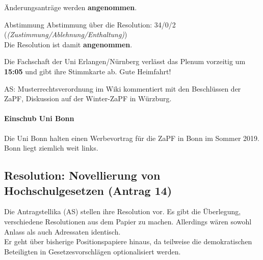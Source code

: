     Änderungsanträge werden \textbf{angenommen}.

    \begin{success}{Abstimmung}
      Abstimmung über die Resolution: 34/0/2 (\textit{(Zustimmung/Ablehnung/Enthaltung)}) \\
      Die Resolution ist damit \textbf{angenommen}.
    \end{success}

    \begin{info}{}
      Die Fachschaft der Uni Erlangen/Nürnberg verlässt das Plenum vorzeitig um \textbf{15:05} und gibt ihre Stimmkarte ab. Gute Heimfahrt!
    \end{info}

    AS: Musterrechtsverordnung im Wiki kommentiert mit den Beschlüssen der ZaPF, Diskussion auf der Winter-ZaPF in Würzburg.

    \paragraph{Einschub Uni Bonn}
      Die Uni Bonn halten einen Werbevortrag für die ZaPF in Bonn im Sommer 2019. Bonn liegt ziemlich weit links.

  \subsection{Resolution: Novellierung von Hochschulgesetzen (Antrag 14)}
    Die Antragstellika (AS) stellen ihre Resolution vor. Es gibt die Überlegung, verschiedene Resolutionen aus dem Papier zu machen. Allerdings wären sowohl Anlass als auch Adressaten identisch. \\
    Er geht über bisherige Positionspapiere hinaus, da teilweise die demokratischen Beteiligten in Gesetzesvorschlägen optionalisiert werden.

